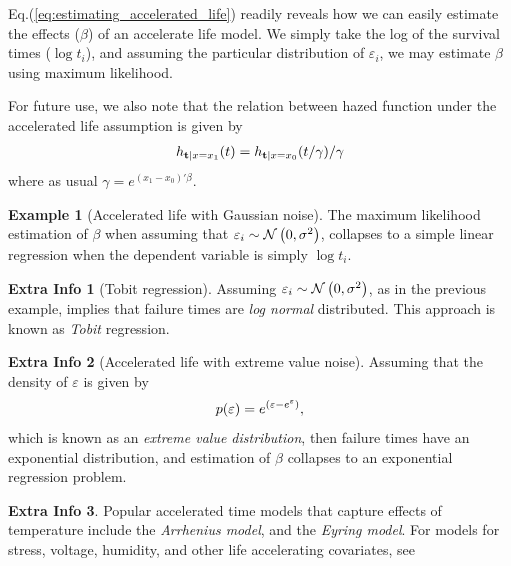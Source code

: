 \documentclass[12pt,a4paper]{report}
\theoremstyle{plain}
\theoremstyle{definition}
\newtheorem{extra}{Extra Info}
\newtheorem{example}{Example}
\begin{document}
Eq.(\ref{eq:estimating_accelerated_life}) readily reveals how we can easily estimate the effects ($\beta$) of an accelerate life model.
We simply take the log of the survival times ($\log t_i$), and assuming the particular distribution of $\varepsilon_i$, we may estimate $\beta$ using maximum likelihood.

For future use, we also note that the relation between hazed function under the accelerated life assumption is given by
\begin{align}
\label{eq:hazard_accelerated_life}
		h_{\mathbf{t}|x=x_1} (t)=h_{\mathbf{t}|x=x_0} (t/\gamma)/ \gamma
\end{align}
where as usual $\gamma=e^{(x_1-x_0)'\beta}$.


\begin{example}[Accelerated life with Gaussian noise]
\label{eg:accelerated_gaussian}
The maximum likelihood estimation of $\beta$ when assuming that $\varepsilon_i \sim \mathcal{N}\left(0,\sigma^2\right)$, collapses to a simple linear regression when the dependent variable is simply $\log t_i$.
\end{example}


\begin{extra}[Tobit regression]
Assuming $\varepsilon_i \sim \mathcal{N}\left(0,\sigma^2\right)$, as in the previous example, implies that failure times are \emph{log normal} distributed. 
This approach is known as \emph{Tobit} regression.
\end{extra}


\begin{extra}[Accelerated life with extreme value noise]
\label{eg:accelerated_exponential}
Assuming that the density of $\varepsilon$ is given by 
$$
	p(\varepsilon)=e^{(\varepsilon-e^\varepsilon)}, 
$$
which is known as an \emph{extreme value distribution}, then failure times have an exponential distribution, and estimation of $\beta$ collapses to an exponential regression problem.
\end{extra}



\begin{extra}
Popular accelerated time models that capture effects of temperature include the \emph{Arrhenius model}, and the \emph{Eyring model}.
For models for stress, voltage, humidity, and other life accelerating covariates, see \cite[Sec.8.1.5]{natrella_nist/sematech_2010}
\end{extra}
\end{document}

